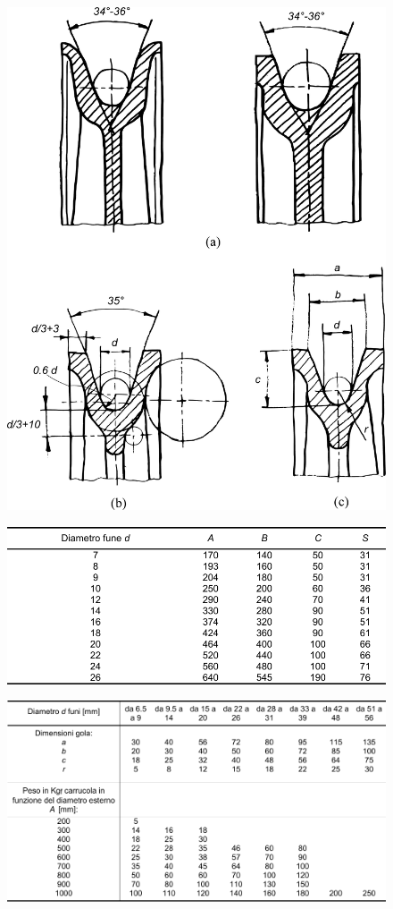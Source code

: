 \begin{figure}[H]
\begin{minipage}{.35\textwidth}
  \includegraphics[width=.9\linewidth]{imgs/Carr2}
  \label{fig:Carr2}
\end{minipage}
\end{figure}

\begin{figure}[H]
\centering
  \includegraphics[width=.6\textwidth]{imgs/CarrTab1}
\caption{}
\label{fig:CarrTab1}
\end{figure}
\begin{figure}[H]
\centering
  \includegraphics[width=.6\textwidth]{imgs/CarrTab2}
\caption{}
\label{fig:CarrTab2}
\end{figure}

